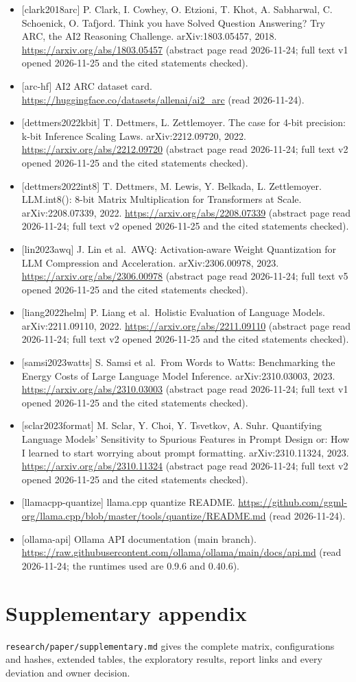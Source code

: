 \documentclass[
]{article}
\providecommand{\tightlist}{%
  \setlength{\itemsep}{0pt}\setlength{\parskip}{0pt}}
\begin{document}
\begin{itemize}
\tightlist
\item
  {[}clark2018arc{]} P. Clark, I. Cowhey, O. Etzioni, T. Khot, A.
  Sabharwal, C. Schoenick, O. Tafjord. Think you have Solved Question
  Answering? Try ARC, the AI2 Reasoning Challenge. arXiv:1803.05457,
  2018. \url{https://arxiv.org/abs/1803.05457} (abstract page read
  2026-11-24; full text v1 opened 2026-11-25 and the cited statements
  checked).
\item
  {[}arc-hf{]} AI2 ARC dataset card.
  \url{https://huggingface.co/datasets/allenai/ai2_arc} (read
  2026-11-24).
\item
  {[}dettmers2022kbit{]} T. Dettmers, L. Zettlemoyer. The case for 4-bit
  precision: k-bit Inference Scaling Laws. arXiv:2212.09720, 2022.
  \url{https://arxiv.org/abs/2212.09720} (abstract page read 2026-11-24;
  full text v2 opened 2026-11-25 and the cited statements checked).
\item
  {[}dettmers2022int8{]} T. Dettmers, M. Lewis, Y. Belkada, L.
  Zettlemoyer. LLM.int8(): 8-bit Matrix Multiplication for Transformers
  at Scale. arXiv:2208.07339, 2022.
  \url{https://arxiv.org/abs/2208.07339} (abstract page read 2026-11-24;
  full text v2 opened 2026-11-25 and the cited statements checked).
\item
  {[}lin2023awq{]} J. Lin et al.~AWQ: Activation-aware Weight
  Quantization for LLM Compression and Acceleration. arXiv:2306.00978,
  2023. \url{https://arxiv.org/abs/2306.00978} (abstract page read
  2026-11-24; full text v5 opened 2026-11-25 and the cited statements
  checked).
\item
  {[}liang2022helm{]} P. Liang et al.~Holistic Evaluation of Language
  Models. arXiv:2211.09110, 2022. \url{https://arxiv.org/abs/2211.09110}
  (abstract page read 2026-11-24; full text v2 opened 2026-11-25 and the
  cited statements checked).
\item
  {[}samsi2023watts{]} S. Samsi et al.~From Words to Watts: Benchmarking
  the Energy Costs of Large Language Model Inference. arXiv:2310.03003,
  2023. \url{https://arxiv.org/abs/2310.03003} (abstract page read
  2026-11-24; full text v1 opened 2026-11-25 and the cited statements
  checked).
\item
  {[}sclar2023format{]} M. Sclar, Y. Choi, Y. Tsvetkov, A. Suhr.
  Quantifying Language Models' Sensitivity to Spurious Features in
  Prompt Design or: How I learned to start worrying about prompt
  formatting. arXiv:2310.11324, 2023.
  \url{https://arxiv.org/abs/2310.11324} (abstract page read 2026-11-24;
  full text v2 opened 2026-11-25 and the cited statements checked).
\item
  {[}llamacpp-quantize{]} llama.cpp quantize README.
  \url{https://github.com/ggml-org/llama.cpp/blob/master/tools/quantize/README.md}
  (read 2026-11-24).
\item
  {[}ollama-api{]} Ollama API documentation (main branch).
  \url{https://raw.githubusercontent.com/ollama/ollama/main/docs/api.md}
  (read 2026-11-24; the runtimes used are 0.9.6 and 0.40.6).
\end{itemize}

\section{Supplementary appendix}\label{supplementary-appendix}

\texttt{research/paper/supplementary.md} gives the complete matrix,
configurations and hashes, extended tables, the exploratory results,
report links and every deviation and owner decision.
\end{document}
